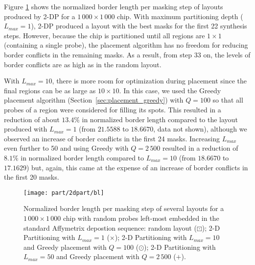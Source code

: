 Figure \ref{fig:2dpart_bl} shows the normalized border length per masking step
of layouts produced by 2-DP for a $1\,000\times 1\,000$ chip. With maximum
partitioning depth ($L_{max}=1$), 2-DP produced a layout with the best masks for
the first 22 synthesis steps. However, because the chip is partitioned until all
regions are $1\times 1$ (containing a single probe), the placement algorithm has
no freedom for reducing border conflicts in the remaining masks. As a result,
from step 33 on, the levels of border conflicts are as high as in the random
layout.

With $L_{max}=10$, there is more room for optimization during placement since
the final regions can be as large as $10\times 10$. In this case, we used the
Greedy placement algorithm (Section~\ref{sec:placement_greedy}) with $Q=100$ so
that all probes of a region were considered for filling its spots. This resulted
in a reduction of about $13.4\%$ in normalized border length compared to the
layout produced with $L_{max}=1$ (from $21.5588$ to $18.6670$, data not shown),
although we observed an increase of border conflicts in the first 24 masks.
Increasing $L_{max}$ even further to 50 and using Greedy with $Q=2\,500$
resulted in a reduction of $8.1\%$ in normalized border length compared to
$L_{max}=10$ (from $18.6670$ to $17.1629$) but, again, this came at the expense
of an increase of border conflicts in the first 20 masks.

\begin{figure}[t]\centering
\texttt{[image: part/2dpart/bl]}
\caption{\label{fig:2dpart_bl}
  Normalized border length per masking step of several layouts for a
  $1\,000\times 1\,000$ chip with random probes left-most embedded in the
  standard Affymetrix depostion sequence: random layout ({\tiny $\boxdot$}); 2-D
  Partitioning with $L_{max}=1$ ({\scriptsize $\times$}); 2-D Partitioning with
  $L_{max}=10$ and Greedy placement with $Q=100$ ({\tiny $\odot$}); 2-D
  Partitioning with $L_{max}=50$ and Greedy placement with $Q=2\,500$
  ({\tiny $+$}).}
\end{figure}

